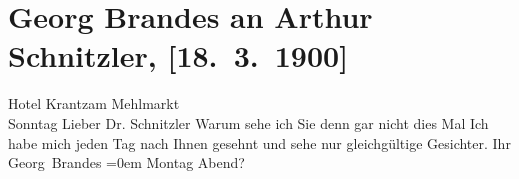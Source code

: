 

         \renewcommand{\erwaehnteOrte}{Orte: Hotel Krantz, Wien}
         \renewcommand{\erwaehnteWerke}{}
               \section[Georg Brandes an Arthur Schnitzler, {[}18. 3. 1900{]}]{ Georg Brandes an Arthur Schnitzler, {[}18. 3. 1900{]}}\nopagebreak{}\rehead{ }\begin{ledgroupsized}[t]{13cm}\normalsize\beginnumbering \toendnotes[C]{\smallbreak\pagebreak[2]} 
\pstart
           \raggedleft{}{\pb}Hotel Krantzam Mehlmarkt {\\}Sonntag\pend
           \pstart{}Lieber Dr. Schnitzler\pend\pstart
           Warum sehe ich Sie denn gar nicht dies Mal{ }{\dotstwo} Ich habe mich jeden Tag nach Ihnen gesehnt und sehe
                    nur gleichgültige Gesichter.\pend
           \pstart
           Ihr{\\[\baselineskip]}\spacefill\mbox{Georg Brandes}\pend
           \leftskip=0em{}\pstart
           \noindent{}Montag Abend?\pend
           
         
         \endnumbering{}\end{ledgroupsized}  \newcommand{\dateiname}{L01022}\newcommand{\titel}{Georg Brandes an Arthur Schnitzler, [18. 3. 1900]}\newcommand{\editorInnen}{Martin Anton Müller und Gerd-Hermann Susen}
      